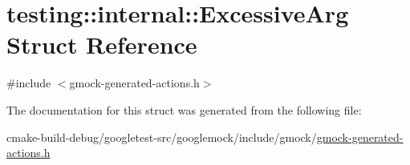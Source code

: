 \hypertarget{structtesting_1_1internal_1_1ExcessiveArg}{}\section{testing\+::internal\+::Excessive\+Arg Struct Reference}
\label{structtesting_1_1internal_1_1ExcessiveArg}


{\ttfamily \#include $<$gmock-\/generated-\/actions.\+h$>$}



The documentation for this struct was generated from the following file\+:\begin{DoxyCompactItemize}
\item 
cmake-\/build-\/debug/googletest-\/src/googlemock/include/gmock/\mbox{\hyperlink{gmock-generated-actions_8h}{gmock-\/generated-\/actions.\+h}}\end{DoxyCompactItemize}
